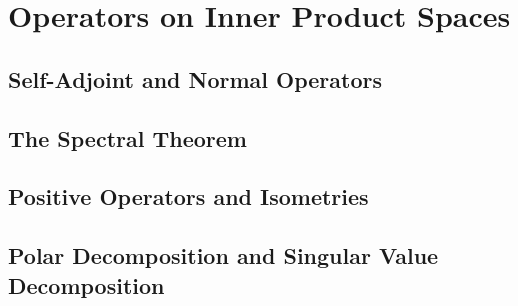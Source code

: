 \chapter{Operators on Inner Product Spaces}

\section{Self-Adjoint and Normal Operators}

\section{The Spectral Theorem}

\section{Positive Operators and Isometries}

\section{Polar Decomposition and Singular Value Decomposition}

